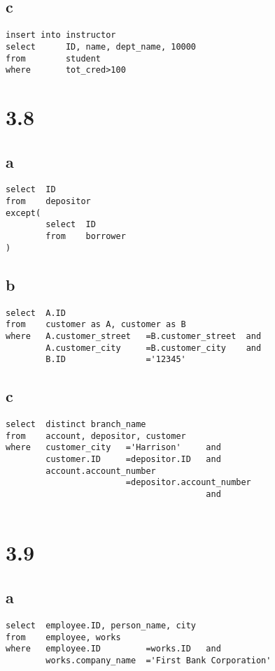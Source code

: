 \documentclass{article}
\begin{document}
    \subsection*{c}
    \begin{verbatim}
insert into instructor
select      ID, name, dept_name, 10000
from        student
where       tot_cred>100
    \end{verbatim}
    \section*{3.8}
    \subsection*{a}
    \begin{verbatim}
select  ID
from    depositor
except(
        select  ID
        from    borrower
)
    \end{verbatim}
    \subsection*{b}
    \begin{verbatim}
select  A.ID
from    customer as A, customer as B
where   A.customer_street   =B.customer_street  and
        A.customer_city     =B.customer_city    and
        B.ID                ='12345'
    \end{verbatim}
    \subsection*{c}
    \begin{verbatim}
select  distinct branch_name
from    account, depositor, customer 
where   customer_city   ='Harrison'     and
        customer.ID     =depositor.ID   and
        account.account_number  
                        =depositor.account_number
                                        and
        
    \end{verbatim}
    \section*{3.9}
    \subsection*{a}
    \begin{verbatim}
select  employee.ID, person_name, city
from    employee, works
where   employee.ID         =works.ID   and
        works.company_name  ='First Bank Corporation'
    \end{verbatim}
    \newpage
\end{document}
